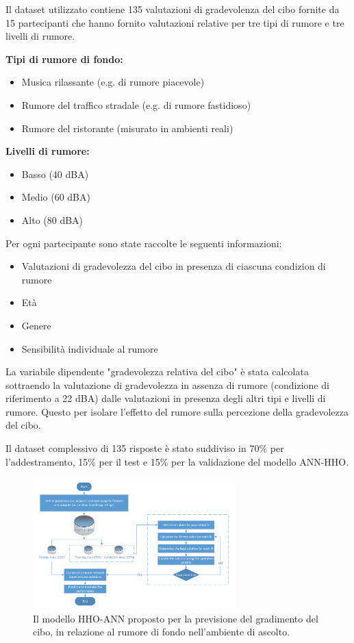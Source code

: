 Il dataset utilizzato contiene 135 valutazioni di gradevolenza del cibo fornite da 15 partecipanti che hanno fornito valutazioni relative per tre tipi di rumore e tre livelli di rumore. \cite{Bellmann2019}

\textbf{Tipi di rumore di fondo:}
\begin{itemize}
      \item Musica rilassante (e.g. di rumore piacevole)
      \item Rumore del traffico stradale (e.g. di rumore fastidioso)
      \item Rumore del ristorante (misurato in ambienti reali)
\end{itemize}

\textbf{Livelli di rumore:}
\begin{itemize}
      \item Basso (40 dBA)
      \item Medio (60 dBA)
      \item Alto (80 dBA)
\end{itemize}

Per ogni partecipante sono state raccolte le seguenti informazioni:

\begin{itemize}
      \item Valutazioni di gradevolezza del cibo in presenza di ciascuna condizion di rumore
      \item Età
      \item Genere
      \item Sensibilità individuale al rumore
\end{itemize}

La variabile dipendente "gradevolezza relativa del cibo" è stata calcolata sottraendo la valutazione di gradevolezza in assenza di rumore (condizione di riferimento a 22 dBA) dalle valutazioni in presenza degli altri tipi e livelli di rumore. Questo per isolare l'effetto del rumore sulla percezione della gradevolezza del cibo.

Il dataset complessivo di 135 risposte è stato suddiviso in 70\% per l'addestramento, 15\% per il test e 15\% per la validazione del modello ANN-HHO.

\begin{figure}[H]
      \centering
      \includegraphics[width=0.7\textwidth]{Chapters/Figures/HHO-ANN.png}
      \caption{Il modello HHO-ANN proposto per la previsione del gradimento del cibo, in relazione al rumore di fondo nell'ambiente di ascolto.}
      \label{hho-ann}
\end{figure}

